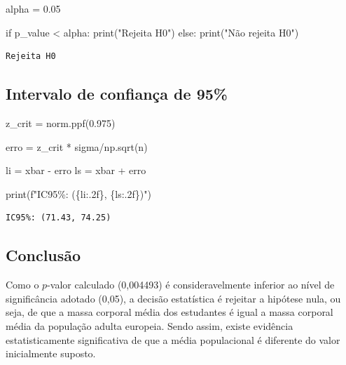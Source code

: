 \documentclass[
  letterpaper,
  DIV=11,
  numbers=noendperiod]{scrreprt}
\newenvironment{Shaded}{\begin{snugshade}}{\end{snugshade}}
\newcommand{\BuiltInTok}[1]{\textcolor[rgb]{0.00,0.23,0.31}{#1}}
\newcommand{\ControlFlowTok}[1]{\textcolor[rgb]{0.00,0.23,0.31}{#1}}
\newcommand{\FloatTok}[1]{\textcolor[rgb]{0.68,0.00,0.00}{#1}}
\newcommand{\NormalTok}[1]{\textcolor[rgb]{0.00,0.23,0.31}{#1}}
\newcommand{\OperatorTok}[1]{\textcolor[rgb]{0.37,0.37,0.37}{#1}}
\newcommand{\SpecialCharTok}[1]{\textcolor[rgb]{0.37,0.37,0.37}{#1}}
\newcommand{\SpecialStringTok}[1]{\textcolor[rgb]{0.13,0.47,0.30}{#1}}
\newcommand{\StringTok}[1]{\textcolor[rgb]{0.13,0.47,0.30}{#1}}
\begin{document}
\begin{Shaded}
\begin{Highlighting}[]
\NormalTok{alpha }\OperatorTok{=} \FloatTok{0.05} 

\ControlFlowTok{if}\NormalTok{ p\_value }\OperatorTok{\textless{}}\NormalTok{ alpha: }
  \BuiltInTok{print}\NormalTok{(}\StringTok{"Rejeita H0"}\NormalTok{) }
\ControlFlowTok{else}\NormalTok{: }
  \BuiltInTok{print}\NormalTok{(}\StringTok{"Não rejeita H0"}\NormalTok{)}
\end{Highlighting}
\end{Shaded}

\begin{verbatim}
Rejeita H0
\end{verbatim}

\subsection{Intervalo de confiança de
95\%}\label{intervalo-de-confianuxe7a-de-95}

\begin{Shaded}
\begin{Highlighting}[]
\NormalTok{z\_crit }\OperatorTok{=}\NormalTok{ norm.ppf(}\FloatTok{0.975}\NormalTok{)}

\NormalTok{erro }\OperatorTok{=}\NormalTok{ z\_crit }\OperatorTok{*}\NormalTok{ sigma}\OperatorTok{/}\NormalTok{np.sqrt(n)}

\NormalTok{li }\OperatorTok{=}\NormalTok{ xbar }\OperatorTok{{-}}\NormalTok{ erro}
\NormalTok{ls }\OperatorTok{=}\NormalTok{ xbar }\OperatorTok{+}\NormalTok{ erro}

\BuiltInTok{print}\NormalTok{(}\SpecialStringTok{f"IC95\%: (}\SpecialCharTok{\{}\NormalTok{li}\SpecialCharTok{:.2f\}}\SpecialStringTok{, }\SpecialCharTok{\{}\NormalTok{ls}\SpecialCharTok{:.2f\}}\SpecialStringTok{)"}\NormalTok{)}
\end{Highlighting}
\end{Shaded}

\begin{verbatim}
IC95%: (71.43, 74.25)
\end{verbatim}

\subsection{Conclusão}\label{conclusuxe3o}

Como o \(p\)-valor calculado (0,004493) é consideravelmente inferior ao
nível de significância adotado (0,05), a decisão estatística é rejeitar
a hipótese nula, ou seja, de que a massa corporal média dos estudantes é
igual a massa corporal média da população adulta europeia. Sendo assim,
existe evidência estatisticamente significativa de que a média
populacional é diferente do valor inicialmente suposto.
\end{document}
